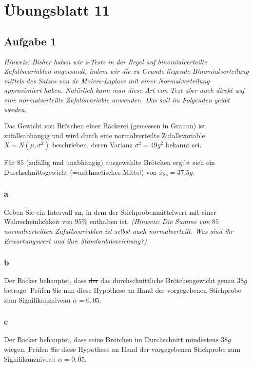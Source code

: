 \chapter{Übungsblatt 11}

\section{Aufgabe 1}

\textit{Hinweis: Bisher haben wir z-Tests in der Regel auf binomialverteilte Zufallsvariablen
    angewandt, indem wir die zu Grunde liegende Binomialverteilung mittels des Satzes von de
    Moivre-Laplace mit einer Normalverteilung approximiert haben. Natürlich kann man diese Art
    von Test aber auch direkt auf eine normalverteilte Zufallsvariable anwenden. Das soll im
    Folgenden geübt werden.}

Das Gewicht von Brötchen einer Bäckerei (gemessen in Gramm) ist zufallsabhängig
und wird durch eine normalverteilte Zufallsvariable $X \sim N(\mu, \sigma^2)$
beschrieben, deren Varianz $\sigma^2 = 49g^2$ bekannt sei.

Für $85$ (zufällig und unabhängig) ausgewählte Brötchen ergibt sich ein
Durchschnittsgewicht (=arithmetisches Mittel) von $\overline{x}_{85} = 37.5g$.

\subsection{a}
Geben Sie ein Intervall an, in dem der Stichprobenmittelwert mit einer
Wahrscheinlichkeit von $95\%$ enthalten ist. \textit{(Hinweis: Die Summe von
    $85$ normalverteilten Zufallsvariablen ist selbst auch normalverteilt. Was sind
    ihr Erwartungswert und ihre Standardabweichung?)}

\subsection{b}

Der Bäcker behauptet, dass \sout{der} das durchschnittliche Brötchengewicht
genau $38g$ betrage. Prüfen Sie nun diese Hypothese an Hand der vorgegebenen
Stichprobe zum Signifikanzniveau $\alpha = 0,05$.

\subsection{c}

Der Bäcker behauptet, dass seine Brötchen im Durchschnitt mindestens $38g$
wiegen. Prüfen Sie diese Hypothese an Hand der vorgegebenen Stichprobe zum
Signifikanzniveau $\alpha = 0,05$.